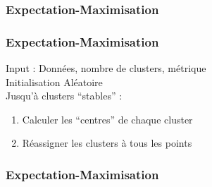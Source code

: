 \begin{frame}
  \frametitle{Expectation-Maximisation}
\end{frame}

\begin{frame}
  \frametitle{Expectation-Maximisation}
  Input : Données, nombre de clusters, métrique \\
  Initialisation Aléatoire \\
  Jusqu'à clusters ``stables'' :\\
  \begin{enumerate}
  \item Calculer les ``centres'' de chaque cluster
  \item Réassigner les clusters à tous les points
  \end{enumerate}
\end{frame}

\begin{frame}
  \frametitle{Expectation-Maximisation}
\end{frame}

